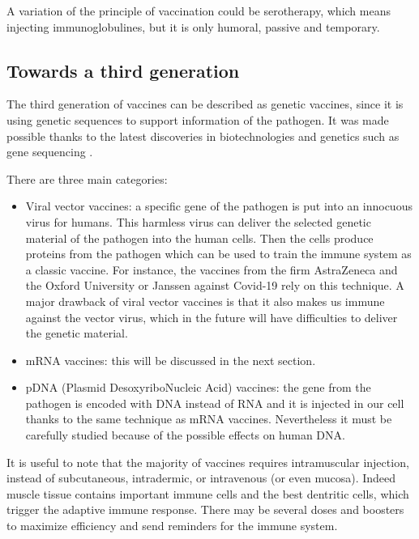 \documentclass{article}
\begin{document}
            A variation of the principle of vaccination could be serotherapy, which means injecting immunoglobulines, but it is only humoral, passive and temporary.

        \subsection{Towards a third generation}

            The third generation of vaccines can be described as genetic vaccines, since it is using genetic sequences to support information of the pathogen. 
            It was made possible thanks to the latest discoveries in biotechnologies and genetics such as gene sequencing \autocite{chavdaDNAVaccinesSARSCoV22021}.  

            There are three main categories:
            \begin{itemize}
                \item Viral vector vaccines: a specific gene of the pathogen is put into an innocuous virus for humans. 
                        This harmless virus can deliver the selected genetic material of the pathogen into the human cells.
                        Then the cells produce proteins from the pathogen which can be used to train the immune system as a classic vaccine.
                        For instance, the vaccines from the firm AstraZeneca and the Oxford University or Janssen against Covid-19 rely on this technique.
                        A major drawback of viral vector vaccines is that it also makes us immune against the vector virus, 
                            which in the future will have difficulties to deliver the genetic material.
                \item mRNA vaccines: this will be discussed in the next section.
                \item pDNA (Plasmid DesoxyriboNucleic Acid) vaccines: the gene from the pathogen is encoded with DNA instead of RNA
                    and it is injected in our cell thanks to the same technique as mRNA vaccines.
                    Nevertheless it must be carefully studied because of the possible effects on human DNA.
            \end{itemize}

            It is useful to note that the majority of vaccines requires intramuscular injection, instead of subcutaneous, intradermic, or intravenous (or even mucosa).
                Indeed muscle tissue contains important immune cells and the best dentritic cells, which trigger the adaptive immune response.
            There may be several doses and boosters to maximize efficiency and send reminders for the immune system. 
\end{document}
